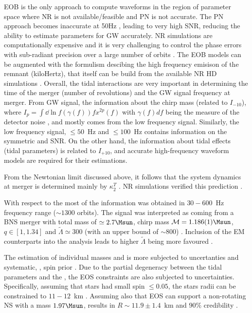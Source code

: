 \ac{EOB} is the only approach to compute waveforms in the region of parameter space where 
\ac{NR} is not available/feasible and \ac{PN} is not accurate.
The \ac{PN} approach becomes inaccurate at 50Hz \cite{6}, leading to very high \ac{SNR},
reducing the ability to estimate parameters for \ac{GW} accurately. 
\ac{NR} simulations are computationally expensive and it is very challenging to 
control the phase errors with sub-radiant precision over a large number of orbits \cite{54}.
The \ac{EOB} models can be augmented with the formulism descibing the 
high frequency emisison of the remnant (kiloHertz), that itself can be build from the 
available \ac{NR} \ac{HD} simulations \cite{56,57,58}. 
%
Overall, the tidal interactions are very important in determining the time of the 
merger (number of revolutions) and the \ac{GW} signal frequency at merger. 
%
%
From \ac{GW} signal, the information about the chirp mass (related to $I_{-10}$),
where $I_p = \int \dd\ln f(\gamma(f))f x^{2p}(f)$ with $\gamma(f)df$ being the 
measure of the detector noise \cite{59,6}, and mostly comes from the low frequency signal.
Similarly, the low frequency signal, $\leq50$~Hz and $\leq100$~Hz contains information 
on the symmetric \mr{} and \ac{SNR}. On the other hand, the information about tidal effects 
(tidal parameters) is related to $I_{+10}$, and accurate high-frequency waveform models 
are required for their estimations. 

From the Newtonian limit discussed above, it follows that the system dynamics at merger 
is determined mainly by $\kappa_2^T$ \cite{44}. \ac{NR} simulations verified this 
prediction \cite{60,55}. 

With respect to the \GW{} most of the information was obtained in $30-600$~Hz frequency 
range ($\sim 1300$ orbits).
The signal was interpreted as coming from a \ac{BNS} merger with total mass of $\simeq2.7\Msun$,
chirp mass $\mathcal{M}=1.186(1)\Msun$, \mr{} $q\in[1,1.34]$ and $\tilde{\Lambda}\simeq 300$ 
(with an upper bound of $\sim800$) \cite{1,2,61}.
Inclusion of the \ac{EM} counterparts into the analysis leads to higher $\tilde{\Lambda}$ being 
more favoured \cite{62,63}.

The estimation of individual masses and \mr{} is more subjected to uncertanties and 
systematic, \ie, spin prior \cite{2}. Due to the partial degeneracy between the tidal 
parameters and the \mr{}, the \ac{EOS} constraints are also subjected to uncertainties. 
Specifically, assuming that stars had small spin $\leq 0.05$, the stars radii can be 
constrained to $11-12$~km \cite{64,65}. 
Assuming also that \ac{EOS} can support a non-rotating \ac{NS} with a mass $1.97\Msun$, 
results in  $R\sim 11.9\pm 1.4$~km and $90\%$ credibility \cite{65}.

